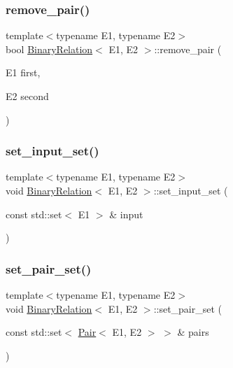 \subsubsection{\texorpdfstring{remove\+\_\+pair()}{remove\_pair()}}
{\footnotesize\ttfamily template$<$typename E1, typename E2$>$ \\
bool \hyperlink{classBinaryRelation}{Binary\+Relation}$<$ E1, E2 $>$\+::remove\+\_\+pair (\begin{DoxyParamCaption}\item[{E1}]{first,  }\item[{E2}]{second }\end{DoxyParamCaption})\hspace{0.3cm}{\ttfamily [inline]}}

\mbox{\label{classBinaryRelation_a0b115484a4a411d873c0b77a4958a019}} 
\subsubsection{\texorpdfstring{set\+\_\+input\+\_\+set()}{set\_input\_set()}}
{\footnotesize\ttfamily template$<$typename E1, typename E2$>$ \\
void \hyperlink{classBinaryRelation}{Binary\+Relation}$<$ E1, E2 $>$\+::set\+\_\+input\+\_\+set (\begin{DoxyParamCaption}\item[{const std\+::set$<$ E1 $>$ \&}]{input }\end{DoxyParamCaption})\hspace{0.3cm}{\ttfamily [inline]}}

\mbox{\label{classBinaryRelation_a300cf42e6c66b9fc3b2ccf1877cc9587}} 
\subsubsection{\texorpdfstring{set\+\_\+pair\+\_\+set()}{set\_pair\_set()}}
{\footnotesize\ttfamily template$<$typename E1, typename E2$>$ \\
void \hyperlink{classBinaryRelation}{Binary\+Relation}$<$ E1, E2 $>$\+::set\+\_\+pair\+\_\+set (\begin{DoxyParamCaption}\item[{const std\+::set$<$ \hyperlink{classPair}{Pair}$<$ E1, E2 $>$ $>$ \&}]{pairs }\end{DoxyParamCaption})\hspace{0.3cm}{\ttfamily [inline]}}

